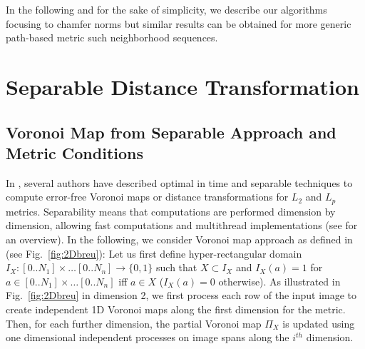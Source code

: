 \documentclass{llncs}
\begin{document}
 In the following and for the sake of simplicity, we describe our
 algorithms focusing to chamfer norms but similar results can be
 obtained for more generic path-based metric such neighborhood
 sequences.
\section{Separable Distance Transformation}
\label{sec:separ-dist-transf}
\subsection{Voronoi Map from Separable Approach and Metric Conditions}
\label{sec:voronoi-map-from}
In \cite{Hirata1996,SaitTori:94,Breu1995,Meijster2000,Maurer2003},
several authors have described optimal in time and separable
techniques to compute error-free Voronoi maps or distance
transformations for $L_2$ and $L_p$ metrics. Separability means that
computations are performed dimension by dimension, allowing fast
computations and multithread implementations (see
\cite{dcoeurjo_ChapDT} for an overview).  In the following, we
consider Voronoi map approach as defined in \cite{Breu1995} (see
Fig.~\ref{fig:2Dbreu}): Let us first define hyper-rectangular domain
$I_X: [0..N_1]\times\ldots[0..N_n] \rightarrow \{0,1\}$ such that
$X\subset I_X$ and $I_X(a)= 1$ for $a\in [0..N_1]\times\ldots[0..N_n]$
iff $a\in X$ ($I_X(a)=0$ otherwise). As illustrated in
Fig.~\ref{fig:2Dbreu} in dimension 2, we first process each row of the
input image to create independent 1D Voronoi maps along the first
dimension for the metric. Then, for each further dimension, the
partial Voronoi map $\Pi_X$ is updated using one dimensional
independent processes on image spans along the $i^{th}$
dimension.



\end{document}
